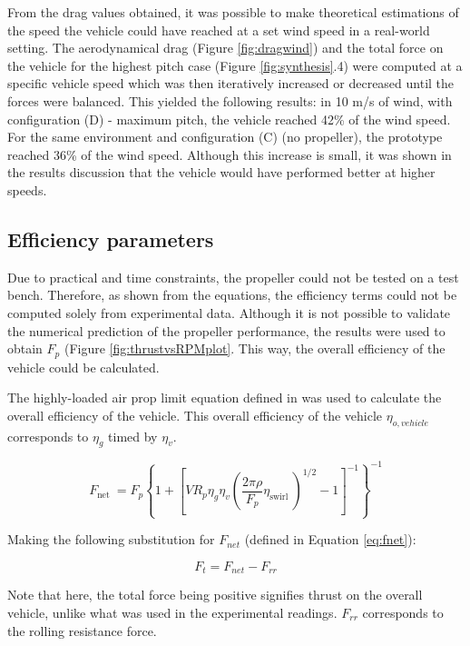 From the drag values obtained, it was possible to make theoretical estimations of the speed the vehicle could have reached at a set wind speed in a real-world setting. The aerodynamical drag (Figure \ref{fig:dragwind}) and the total force on the vehicle for the highest pitch case (Figure \ref{fig:synthesis}.4) were computed at a specific vehicle speed which was then iteratively increased or decreased until the forces were balanced. This yielded the following results: in 10 m/s of wind, with configuration (D) - maximum pitch, the vehicle reached 42\% of the wind speed. For the same environment and configuration (C) (no propeller), the prototype reached 36\% of the wind speed. Although this increase is small, it was shown in the results discussion that the vehicle would have performed better at higher speeds.

\subsection{Efficiency parameters}

Due to practical and time constraints, the propeller could not be tested on a test bench. Therefore, as shown from the equations, the efficiency terms could not be computed solely from experimental data. Although it is not possible to validate the numerical prediction of the propeller performance, the results were used to obtain $F_p$ (Figure \ref{fig:thrustvsRPMplot}. This way, the overall efficiency of the vehicle could be calculated.

The highly-loaded air prop limit equation defined in \cite{drela20dead} was used to calculate the overall efficiency of the vehicle. This overall efficiency of the vehicle $\eta_{o, vehicle}$ corresponds to $\eta_g$ timed by $\eta_v$.

\begin{equation}
F_{\text {net }}=F_{p}\left\{1+\left[V R_{p} \eta_{g} \eta_{v}\left(\frac{2 \pi \rho}{F_{p}} \eta_{\text {swirl }}\right)^{1 / 2}-1\right]^{-1}\right\}^{-1}
\label{eq:highlyloaded}
\end{equation}

Making the following substitution for $F_{net}$ (defined in Equation \ref{eq:fnet}):

\begin{equation}
    F_t = F_{net}-F_{rr}
    \label{eq:ftotal}
\end{equation}

Note that here, the total force being positive signifies thrust on the overall vehicle, unlike what was used in the experimental readings. $F_{rr}$ corresponds to the rolling resistance force.

